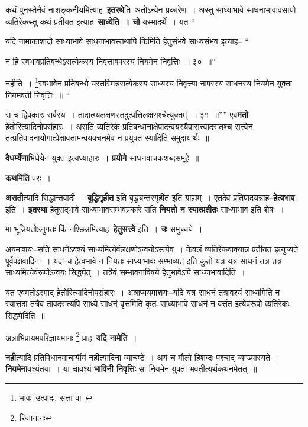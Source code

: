 \documentclass[article,12pt,a4paper]{memoir}
\begin{document}
	  \pstart कथं पुनस्तेनैवं नाशङ्कनीयमित्याह--\textbf{इतरथे}ति--अतोऽन्येन प्रकारेण । अस्तु साध्याभावे साधनाभावावसायो व्यतिरेकस्तु कथं प्रतीयत इत्याह--\textbf{साध्येति । चो} यस्मादर्थे । यत  \leavevmode{} “
	  
	यदि नामाकाशादौ साध्याभावे साधनाभावस्तथापि किमिति हेतुसंभवे साध्यसंभव इत्याह-- “
	  
	न हि स्वभावप्रतिबन्धेऽसत्येकस्य निवृत्तावपरस्य नियमेन निवृत्तिः ॥ ३० ॥” 
	  
	नहीति । \footnote{भावः--उत्पादः, सत्ता वा--\cite{dp-msD-n}}स्वभावेन प्रतिबन्धो यस्तस्मिन्नसत्येकस्य साध्यस्य निवृत्त्या नापरस्य साधनस्य नियमेन युक्ता नियमवती निवृत्तिः ॥ “
	  
	स च द्विप्रकारः सर्वस्य । तादात्म्यलक्षणस्तदुत्पत्तिलक्षणश्चेत्युक्तम् ॥ ३१ ॥”” एव\textbf{मतो} हेतोरित्यादिनोपसंहारः । असति व्यतिरेके प्रतिबन्धानाक्षेपादन्वयस्यैवासत्त्वादसतश्च सत्त्वेन तत्प्रतिपादनायोगात्प्रेक्षावतामन्वयवचनमेव न प्रयुक्तं स्यादिति समुदायार्थः ॥
	\pend
      

	  \pstart \textbf{वैधर्म्येणा}भिधेयेन युक्त इत्यध्याहारः । \textbf{प्रयोगे} साधनवाचकशब्दसमूहे ॥
	\pend
      

	  \pstart \textbf{कथमिति} परः ।
	\pend
      

	  \pstart \textbf{असती}त्यादि सिद्धान्तवादी । \textbf{बुद्धिगृहीत} इति बुद्ध्यन्तरगृहीत इति ग्राह्यम् । एतदेव प्रतिपादयन्नाह--\textbf{हेत्वभाव} इति । \textbf{इतरथा} हेतुसद्भावे साध्याभावसम्भवप्रकारे सति \textbf{नियतो न स्यात्प्रतीतः} साध्याभाव इति शेषः ।
	\pend
      

	  \pstart मा भून्नियतोऽनुगतः किं नश्छिन्नमित्याह--\textbf{हेतुसत्त्वे} इति । \textbf{चः} समुच्चये ।
	\pend
      

	  \pstart अयमाशयः--सति साधनेऽवश्यं साध्यमित्येवंलक्षणोऽन्वयोऽस्त्येव । केवलं व्यतिरेकवाक्यान्न प्रतीयत इत्युच्यते पूर्वपक्षवादिना । यदा च हेत्वभावे न नियतः साध्याभावः सम्भाव्यत इति कुतो यत्र यत्र साधनं तत्र तत्र साध्यमित्येवंरूपोऽन्वयः सिद्ध्येत् । तत्रैवं सम्भावनाविषये हेतुभावेऽपि साध्याभावादिति ।
	\pend
      

	  \pstart यत एवमतोऽस्माद् हेतोरित्यादिनोपसंहारः । अत्राप्ययमाशयः--यदि यत्र साधनं तत्रावश्यं साध्यमिति न स्यात्तदा तत्रैव तावदसत्यपि साध्ये साधनं वृत्तमिति कुतः साध्याभावे साधनं न वर्त्तत इत्येवंरूपो व्यतिरेकः सिद्ध्येदिति ॥
	\pend
      

	  \pstart अत्राभिप्रायमपरिज्ञायमानः \footnote{रिजानानः} प्राह--\textbf{यदि नामेति} ।
	\pend
      

	  \pstart \textbf{नही}त्यादि प्रतिविधानमाचार्यीयं नहीत्यादिना व्याचष्टे । अयं च मौलो हिशब्दः पश्चाद् व्याख्यास्यते । \textbf{नियमेना}वश्यंतया । या चावश्यं \textbf{भाविनी निवृत्तिः} सा नियमेन युक्ता भवतीत्यर्थकथनमेतत् ॥
	\pend
      \leavevmode{}
	  \bigskip
	  \begingroup
	
\end{document}
